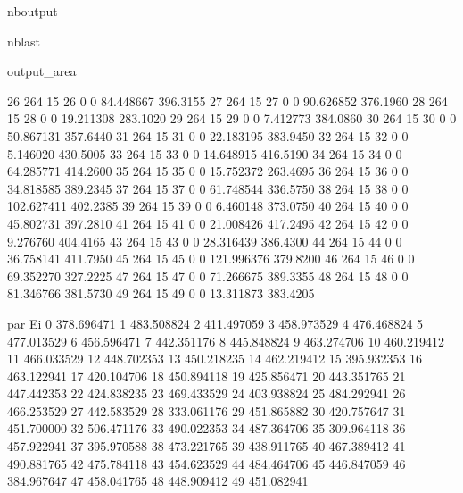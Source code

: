 \documentclass[letterpaper,10pt,english]{sphinxmanual}
\begin{document}
\begin{sphinxuseclass}{nboutput}
\begin{sphinxuseclass}{nblast}
{\begin{sphinxuseclass}{output_area}
\begin{sphinxuseclass}{}
\begin{sphinxVerbatim}[commandchars=\\\{\}]
26  264    15        26      0               0   84.448667  396.3155
27  264    15        27      0               0   90.626852  376.1960
28  264    15        28      0               0   19.211308  283.1020
29  264    15        29      0               0    7.412773  384.0860
30  264    15        30      0               0   50.867131  357.6440
31  264    15        31      0               0   22.183195  383.9450
32  264    15        32      0               0    5.146020  430.5005
33  264    15        33      0               0   14.648915  416.5190
34  264    15        34      0               0   64.285771  414.2600
35  264    15        35      0               0   15.752372  263.4695
36  264    15        36      0               0   34.818585  389.2345
37  264    15        37      0               0   61.748544  336.5750
38  264    15        38      0               0  102.627411  402.2385
39  264    15        39      0               0    6.460148  373.0750
40  264    15        40      0               0   45.802731  397.2810
41  264    15        41      0               0   21.008426  417.2495
42  264    15        42      0               0    9.276760  404.4165
43  264    15        43      0               0   28.316439  386.4300
44  264    15        44      0               0   36.758141  411.7950
45  264    15        45      0               0  121.996376  379.8200
46  264    15        46      0               0   69.352270  327.2225
47  264    15        47      0               0   71.266675  389.3355
48  264    15        48      0               0   81.346766  381.5730
49  264    15        49      0               0   13.311873  383.4205

        par Ei
0   378.696471
1   483.508824
2   411.497059
3   458.973529
4   476.468824
5   477.013529
6   456.596471
7   442.351176
8   445.848824
9   463.274706
10  460.219412
11  466.033529
12  448.702353
13  450.218235
14  462.219412
15  395.932353
16  463.122941
17  420.104706
18  450.894118
19  425.856471
20  443.351765
21  447.442353
22  424.838235
23  469.433529
24  403.938824
25  484.292941
26  466.253529
27  442.583529
28  333.061176
29  451.865882
30  420.757647
31  451.700000
32  506.471176
33  490.022353
34  487.364706
35  309.964118
36  457.922941
37  395.970588
38  473.221765
39  438.911765
40  467.389412
41  490.881765
42  475.784118
43  454.623529
44  484.464706
45  446.847059
46  384.967647
47  458.041765
48  448.909412
49  451.082941
\end{sphinxVerbatim}



\end{sphinxuseclass}
\end{sphinxuseclass}
}

\end{sphinxuseclass}
\end{sphinxuseclass}
\end{document}
